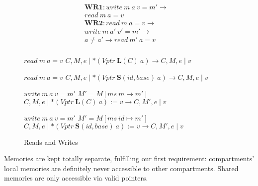 \documentclass{article}
\begin{document}
\begin{figure}

  \begin{minipage}[t]{0.3\textwidth}
    \[\begin{aligned}
    \mathbf{WR1} : \mathit{write} ~ m ~ a ~ v = m' \rightarrow & \\
    \mathit{read} ~ m ~ a = v & \\[0.75em]
    \mathbf{WR2} : \mathit{read} ~ m ~ a = v \rightarrow & \\
    \mathit{write} ~ m ~ a' ~ v' = m' \rightarrow & \\
    a \not = a' \rightarrow \mathit{read} ~ m' ~ a = v & \\[0.75em]
    \end{aligned}\]
  \end{minipage}
  \begin{minipage}[t]{0.69\textwidth}
                {\(\mathit{read} ~ m ~ a = v\)}
                {\(C,M,e \mid *(\mathit{Vptr} ~ \mathbf{L}(C) ~ a)
                  \longrightarrow C,M,e \mid v\)}

                {\(\mathit{read} ~ m ~ a = v\)}
                {\(C,M,e \mid *(\mathit{Vptr} ~ \mathbf{S}(id, \mathit{base}) ~ a)
                  \longrightarrow C,M,e \mid v\)}

                  {\(\mathit{write} ~ m ~ a ~ v = m'\)}
                  {\(M' = M[ms ~ m \mapsto m']\)}
                  {\(C,M,e \mid *(\mathit{Vptr} ~ \mathbf{L}(C) ~ a) := v
                    \longrightarrow C,M',e \mid v\)}

                  {\(\mathit{write} ~ m ~ a ~ v = m'\)}
                  {\(M' = M[ms ~ id \mapsto m']\)}
                  {\(C,M,e \mid *(\mathit{Vptr} ~ \mathbf{S}(id, \mathit{base}) ~ a) := v
                    \longrightarrow C,M',e \mid v\)}
  \end{minipage}

  \caption{Reads and Writes }
  \label{subfig:rwstep}
\end{figure}


Memories are kept totally separate, fulfilling our first requirement:
compartments' local memories are definitely never accessible to other compartments.
Shared memories are only accessible via valid pointers.
\end{document}
